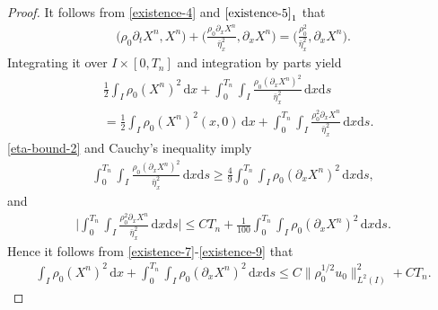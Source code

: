 \documentclass[11pt, reqno]{amsart}
\newcommand{\diff}{\mathrm{d}}
\numberwithin{equation}{section}
\begin{document}
{\begin{proof}
It follows from  \eqref{existence-4} and \(\eqref{existence-5}_1\) that
\begin{align*}
	\big(\rho_0\partial_tX^n,X^n\big)
	+\bigg(\frac{\rho_0\partial_xX^n}{\bar{\eta}_x^2},\partial_xX^n\bigg)
	=\bigg(\frac{\rho_0^2}{\bar{\eta}_x^2},\partial_xX^n\bigg).
\end{align*}
Integrating it over \(I\times[0,T_n]\) and integration by parts yield
\begin{equation}\label{existence-7}
	\begin{aligned}
		&\frac{1}{2}\int_I \rho_0(X^n)^2\,\diff x
		+\int_0^{T_n}\int_I\frac{\rho_0(\partial_xX^n)^2}{\bar{\eta}_x^2}\,\diff x\diff s\\
		&=\frac{1}{2}\int_I \rho_0(X^n)^2(x,0)\,\diff x
		+\int_0^{T_n}\int_I\frac{\rho_0^2\partial_xX^n}{\bar{\eta}_x^2}\,\diff x\diff s.
	\end{aligned}
\end{equation}
\eqref{eta-bound-2} and Cauchy's inequality imply
\begin{equation}\label{existence-8}
	\begin{aligned}
		\int_0^{T_n}\int_I\frac{\rho_0(\partial_xX^n)^2}{\bar{\eta}_x^2}\,\diff x\diff s
		\geq \frac{4}{9} \int_0^{T_n}\int_I\rho_0(\partial_xX^n)^2\,\diff x\diff s,
	\end{aligned}
\end{equation}
and
\begin{equation}\label{existence-9}
	\begin{aligned}
		\bigg|\int_0^{T_n}\int_I\frac{\rho_0^2\partial_xX^n}{\bar{\eta}_x^2}\,\diff x\diff s\bigg|
		\leq CT_n+\frac{1}{100}\int_0^{T_n}\int_I\rho_0(\partial_xX^n)^2\,\diff x\diff s.
	\end{aligned}
\end{equation}
Hence it follows from \eqref{existence-7}-\eqref{existence-9} that
\begin{equation}\label{existence-10}
	\begin{aligned}
		\int_I \rho_0(X^n)^2\,\diff x
		+\int_0^{T_n}\int_I\rho_0(\partial_xX^n)^2\,\diff x\diff s
		\leq C\|\rho_0^{1/2}u_0\|_{L^2(I)}^2+CT_n.
	\end{aligned}
\end{equation}




\end{proof}}
\end{document}

